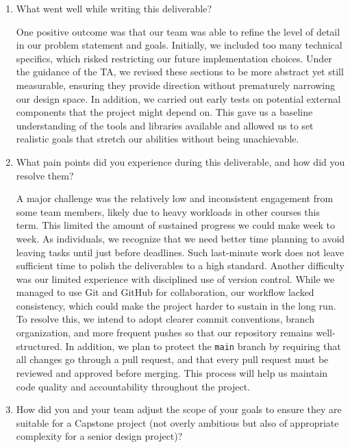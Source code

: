 \documentclass{article}
\begin{document}
\begin{enumerate}

    \setlength{\parskip}{1.6em} 
    
    \item What went well while writing this deliverable?
    
    One positive outcome was that our team was able to refine the level of detail in our 
    problem statement and goals. Initially, we included too many technical specifics, which 
    risked restricting our future implementation choices. Under the guidance of the TA, 
    we revised these sections to be more abstract yet still measurable, ensuring they provide 
    direction without prematurely narrowing our design space. In addition, we carried out 
    early tests on potential external components that the project might depend on. This gave 
    us a baseline understanding of the tools and libraries available and allowed us to set 
    realistic goals that stretch our abilities without being unachievable.

    \item What pain points did you experience during this deliverable, and how
    did you resolve them?

    A major challenge was the relatively low and inconsistent engagement from some team 
    members, likely due to heavy workloads in other courses this term. This limited the 
    amount of sustained progress we could make week to week. As individuals, we recognize 
    that we need better time planning to avoid leaving tasks until just before deadlines. 
    Such last-minute work does not leave sufficient time to polish the deliverables to 
    a high standard. Another difficulty was our limited experience with disciplined use 
    of version control. While we managed to use Git and GitHub for collaboration, our 
    workflow lacked consistency, which could make the project harder to sustain in the 
    long run. To resolve this, we intend to adopt clearer commit conventions, branch organization, 
    and more frequent pushes so that our repository remains well-structured. 
    In addition, we plan to protect the \texttt{main} branch by requiring that all 
    changes go through a pull request, and that every pull request must be reviewed 
    and approved before merging. This process will help us maintain code quality 
    and accountability throughout the project.


    \item How did you and your team adjust the scope of your goals to ensure
    they are suitable for a Capstone project (not overly ambitious but also of
    appropriate complexity for a senior design project)?


\end{enumerate}
\end{document}
